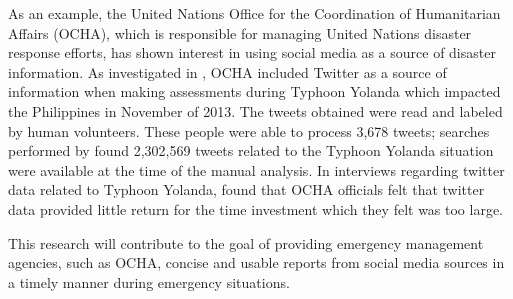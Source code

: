 \documentclass[conference]{IEEEtran}
\begin{document}
As an example, the United Nations Office for the Coordination of Humanitarian Affairs (OCHA), which is responsible for managing United Nations disaster response efforts, has shown interest in using social media as a source of disaster information. As investigated in \cite{vieweg2014}, OCHA included Twitter as a source of information when making assessments during Typhoon Yolanda which impacted the Philippines in November of 2013. The tweets obtained were read and labeled by human volunteers. These people were able to process 3,678 tweets; searches performed by \cite{vieweg2014} found 2,302,569 tweets related to the Typhoon Yolanda situation were available at the time of the manual analysis. In interviews regarding twitter data related to Typhoon Yolanda, \cite{vieweg2014} found that OCHA officials felt that twitter data provided little return for the time investment which they felt was too large.

This research will contribute to the goal of providing emergency management agencies, such as OCHA, concise and usable reports from social media sources in a timely manner during emergency situations.

%
%

\end{document}
